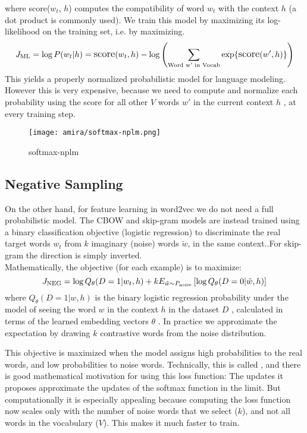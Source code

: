 where \text score({$w_t$}, $h$) computes the compatibility of word ${w_t}$ with the context ${h}$ (a dot product is commonly used). We train this model by maximizing its log-likelihood on the training set, i.e. by maximizing. 
 \begin{equation}
        \large 
           J_\text{ML} = \log P(w_t | h)
                       = \text{score} (w_t, h) -
                       \log \left( \sum_\text{Word w' in Vocab} \exp\{ \text{score} (w', h) \} \right)
 \end{equation}
 This yields a properly normalized probabilistic model for language modeling. However this is very expensive, because we need to compute and normalize each probability using the score for all other $V$  words $w'$ in the current context $h$ , at every training step.
\begin{figure}[H]%
    \center%
    \texttt{[image: amira/softmax-nplm.png]}%
    \caption[softmax]{softmax-nplm}\label{fig:softmax}%
  \end{figure}
  

\subsection{Negative Sampling}
On the other hand, for feature learning in word2vec we do not need a full probabilistic model. The CBOW and skip-gram models are instead trained using a binary classification objective (logistic regression) to discriminate the real target words $w_t$ from $k$ imaginary (noise) words $\tilde w$, in the same context..For skip-gram the direction is simply inverted.\\ Mathematically, the objective (for each example) is to maximize:
  \begin{equation}
     \large
        J_\text{NEG} = \log Q_\theta(D=1 |w_t, h) +
        k {\space{E}}_{\tilde w \sim P_\text{noise}}
        \left[ \log Q_\theta(D = 0 |\tilde w, h) \right]
  \end{equation}
  where $Q_\theta(D=1 | w, h)$  is the binary logistic regression probability under the model of seeing the word $w$ in the context $h$ in the dataset $D$ , calculated in terms of the learned embedding vectors $\theta$ . In practice we approximate the expectation by drawing $k$  contrastive words from the noise distribution.

 This objective is maximized when the model assigns high probabilities to the real words, and low probabilities to noise words. Technically, this is called \textcite{ Negative Sampling}, and there is good mathematical motivation for using this loss function: The updates it proposes approximate the updates of the softmax function in the limit. But computationally it is especially appealing because computing the loss function now scales only with the number of noise words that we select ($k$), and not all words in the vocabulary ($V$). This makes it much faster to train.
 
